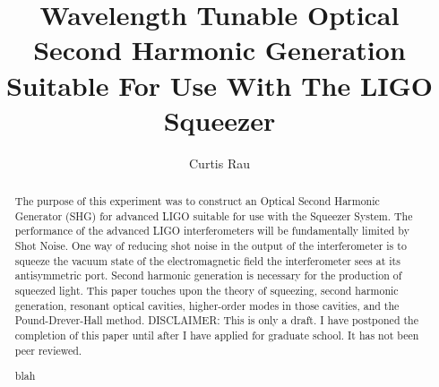 \documentclass{article}
\author{Curtis Rau}
\title{Wavelength Tunable Optical Second Harmonic Generation Suitable For Use With The LIGO Squeezer}
\begin{document}
\maketitle

\begin{abstract}
The purpose of this experiment was to construct an Optical Second Harmonic Generator (SHG) for advanced LIGO suitable for use with the Squeezer System.  The performance of the advanced LIGO interferometers will be fundamentally limited by Shot Noise.  One way of reducing shot noise in the output of the interferometer is to squeeze the vacuum state of the electromagnetic field the interferometer sees at its antisymmetric port.  Second harmonic generation is necessary for the production of squeezed light.  This paper touches upon the theory of squeezing, second harmonic generation, resonant optical cavities, higher-order modes in those cavities, and the Pound-Drever-Hall method.  DISCLAIMER: This is only a draft.  I have postponed the completion of this paper until after I have applied for graduate school.  It has not been peer reviewed.

blah
\end{abstract}




\end{document}
